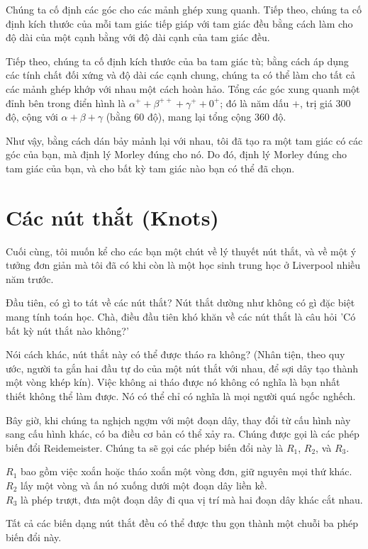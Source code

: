 \documentclass[12pt,a4paper]{article}
\begin{document}
Chúng ta cố định các góc cho các mảnh ghép xung quanh. Tiếp theo, chúng ta cố định kích thước của mỗi tam giác tiếp giáp với tam giác đều bằng cách làm cho độ dài của một cạnh bằng với độ dài cạnh của tam giác đều.

Tiếp theo, chúng ta cố định kích thước của ba tam giác tù; bằng cách áp dụng các tính chất đối xứng và độ dài các cạnh chung, chúng ta có thể làm cho tất cả các mảnh ghép khớp với nhau một cách hoàn hảo. Tổng các góc xung quanh một đỉnh bên trong điển hình là $\alpha^+ + \beta^{++} + \gamma^+ + 0^+$; đó là năm dấu $+$, trị giá 300 độ, cộng với $\alpha + \beta + \gamma$ (bằng 60 độ), mang lại tổng cộng 360 độ.

Như vậy, bằng cách dán bảy mảnh lại với nhau, tôi đã tạo ra một tam giác có các góc của bạn, mà định lý Morley đúng cho nó. Do đó, định lý Morley đúng cho tam giác của bạn, và cho bất kỳ tam giác nào bạn có thể đã chọn.

\section*{Các nút thắt (Knots)}
Cuối cùng, tôi muốn kể cho các bạn một chút về lý thuyết nút thắt, và về một ý tưởng đơn giản mà tôi đã có khi còn là một học sinh trung học ở Liverpool nhiều năm trước.

Đầu tiên, có gì to tát về các nút thắt? Nút thắt dường như không có gì đặc biệt mang tính toán học. Chà, điều đầu tiên khó khăn về các nút thắt là câu hỏi 'Có bất kỳ nút thắt nào không?'

Nói cách khác, nút thắt này có thể được tháo ra không? (Nhân tiện, theo quy ước, người ta gắn hai đầu tự do của một nút thắt với nhau, để sợi dây tạo thành một vòng khép kín). Việc không ai tháo được nó không có nghĩa là bạn nhất thiết không thể làm được. Nó có thể chỉ có nghĩa là mọi người quá ngốc nghếch.

Bây giờ, khi chúng ta nghịch ngợm với một đoạn dây, thay đổi từ cấu hình này sang cấu hình khác, có ba điều cơ bản có thể xảy ra. Chúng được gọi là các phép biến đổi Reidemeister. Chúng ta sẽ gọi các phép biến đổi này là $R_1$, $R_2$, và $R_3$.

$R_1$ bao gồm việc xoắn hoặc tháo xoắn một vòng đơn, giữ nguyên mọi thứ khác. \\
$R_2$ lấy một vòng và ấn nó xuống dưới một đoạn dây liền kề. \\
$R_3$ là phép trượt, đưa một đoạn dây đi qua vị trí mà hai đoạn dây khác cắt nhau.

Tất cả các biến dạng nút thắt đều có thể được thu gọn thành một chuỗi ba phép biến đổi này.
\end{document}

